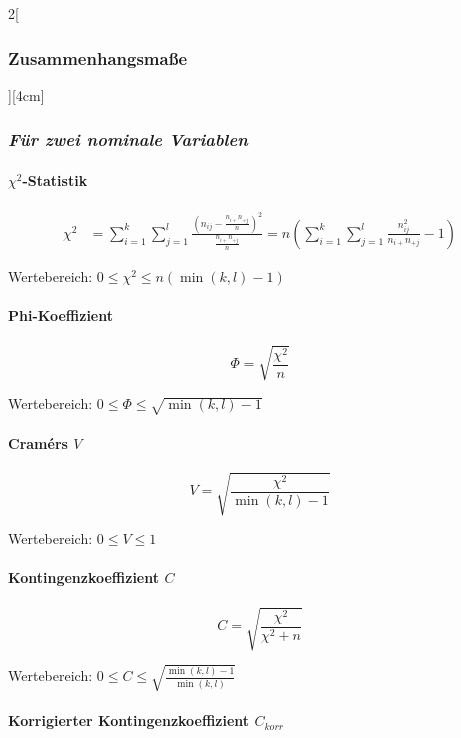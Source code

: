 \documentclass[8pt]{extarticle}
\begin{document}
\begin{multicols}{2}[\subsubsection{Zusammenhangsmaße}][4cm]

\subsubsection*{\textit{Für zwei nominale Variablen}}

\paragraph{$\chi^2$-Statistik}

\begin{equation*}
\begin{split}
\chi^2 & =\sum\limits_{i=1}^k \sum\limits_{j=1}^l \frac{(n_{ij}-\frac{n_{i+}n_{+j}}{n})^2}{\frac{n_{i+}n_{+j}}{n}}  =n\left(\sum\limits_{i=1}^k \sum\limits_{j=1}^l \frac{n_{ij}^2}{n_{i+}n_{+j}}-1\right)
\end{split}
\end{equation*}

Wertebereich: $ 0 \le \chi^2 \le n(\min(k,l)-1)$

\paragraph{Phi-Koeffizient}

$$\Phi=\sqrt{\frac{\chi^2}{n}}$$

Wertebereich: $ 0 \le \Phi \le \sqrt{\min(k,l)-1}$

\paragraph{Cram\'ers $V$}

$$ V= \sqrt{\frac{\chi^2}{\min(k,l)-1}}$$

Wertebereich: $ 0 \le V \le 1$

\paragraph{Kontingenzkoeffizient $C$}

$$C=\sqrt{\frac{\chi^2}{\chi^2 + n}}$$

Wertebereich: $ 0 \le C \le \sqrt{\frac{\min(k,l)-1}{\min(k,l)}} $

\paragraph{Korrigierter Kontingenzkoeffizient $C_{korr}$}


\end{multicols}
\end{document}
